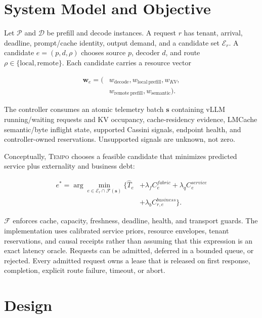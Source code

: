\documentclass[10pt,twocolumn]{article}
\newcommand{\system}{\textsc{Tempo}\xspace}
\begin{document}
\section{System Model and Objective}

Let $\mathcal{P}$ and $\mathcal{D}$ be prefill and decode instances.  A request
$r$ has tenant, arrival, deadline, prompt/cache identity, output demand, and a
candidate set $\mathcal{E}_r$.  A candidate
$e=(p,d,\rho)$ chooses source $p$, decoder $d$, and route $\rho\in
\{\mathrm{local},\mathrm{remote}\}$.  Each candidate carries a resource vector

\begin{equation}
  \begin{aligned}
  \mathbf{w}_e = (&w_{\mathrm{decode}}, w_{\mathrm{local\ prefill}}, w_{KV},\\
                   &w_{\mathrm{remote\ prefill}}, w_{\mathrm{semantic}}).
  \end{aligned}
\end{equation}

The controller consumes an atomic telemetry batch $\mathbf{s}$ containing
vLLM running/waiting requests and KV occupancy, cache-residency evidence,
LMCache semantic/byte inflight state, supported Cassini signals, endpoint
health, and controller-owned reservations.  Unsupported signals are unknown,
not zero.

Conceptually, \system chooses a feasible candidate that minimizes predicted
service plus externality and business debt:

\begin{equation}
 \begin{aligned}
 e^* = \arg\min_{e\in\mathcal{E}_r\cap\mathcal{F}(\mathbf{s})}
  \{\widehat{T}_e &+ \lambda_f C_e^{fabric}
  + \lambda_q C_e^{service}\\
  &+ \lambda_b C_{r,e}^{business}\}.
 \end{aligned}
\end{equation}

$\mathcal{F}$ enforces cache, capacity, freshness, deadline, health, and
transport guards.  The implementation uses calibrated service priors,
resource envelopes, tenant reservations, and causal receipts rather than
assuming that this expression is an exact latency oracle.  Requests can be
admitted, deferred in a bounded queue, or rejected.  Every admitted request
owns a lease that is released on first response, completion, explicit route
failure, timeout, or abort.

\section{Design}
\end{document}
